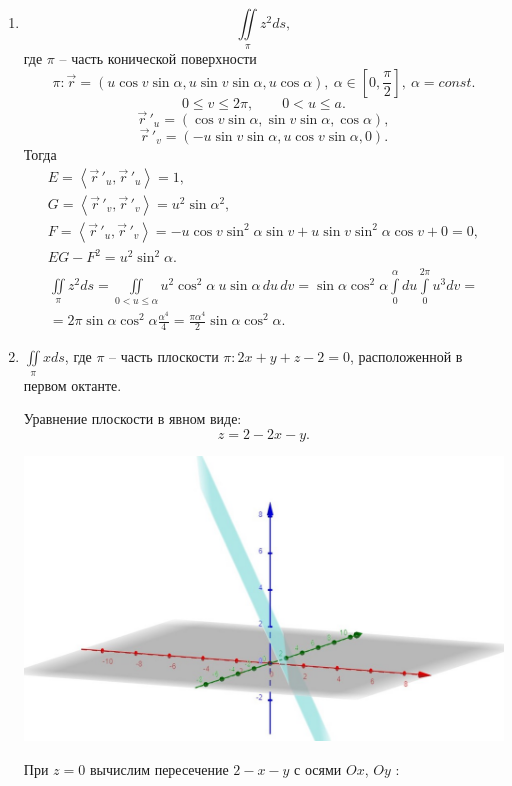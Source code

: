 \documentclass[../../main.tex]{subfiles}
\begin{document}
	\begin{exmps}
	
	\,
	
	\begin{enumerate}
	\item
	\[ \iint \limits_\pi z^2 ds,\] где $\pi$ \--- часть конической 
	поверхности
	\[\pi: \vec{r} = (u\cos v\sin \alpha, u\sin v\sin\alpha, 
	u\cos\alpha) , \ 
	  \alpha\in \left[0, \frac{\pi}{2}\right], \ \alpha = const.\] 
	\[0 \leq v \leq 2\pi, \qquad 0 < u \leq a. \]
	\[\vec r\,'_u = (\cos v \sin \alpha, \sin v \sin \alpha, \cos \alpha), \]
	\[\vec r\,'_v = (-u \sin v \sin \alpha, u \cos v \sin \alpha, 0).  \]
	Тогда
	\begin{gather*}
	E = \left<\vec r\,'_u, \vec r\,'_u\right>= 1, \\ G = \left<\vec r\,'_v, \vec 
	r\,'_v\right> = u^2 \sin \alpha^2, \\
	F = \left<\vec r\,'_u, \vec r\,'_v\right> = -u \cos v \sin^2 \alpha \sin 
	v +
	 u \sin v \sin ^2 \alpha \cos v+0 =0, \\
	EG - F^2 = u^2 \sin^2 \alpha.
	\end{gather*}
	\begin{gather*}
	\iint \limits_\pi z^2 ds = \iint\limits_{0<u \leq \alpha} u^2 \cos^2 \alpha
	 \ u \sin \alpha \,du\, dv = \sin \alpha \cos ^2 \alpha \int \limits_0^\alpha 
	 du
	  \int \limits_0 ^{2\pi} u^3 dv = \\ = 2 \pi \sin \alpha \cos ^2 \alpha 
	  \frac{\alpha^4}{4} =
	   \frac{\pi \alpha^4}{2} \sin \alpha \cos^2 \alpha.
	\end{gather*}
	\item 
	$\displaystyle\iint \limits_\pi x ds$, где $\pi$ \--- часть плоскости
	$\pi : 2x+y+z-2=0$, расположенной в первом октанте.
	
	Уравнение плоскости в явном виде:
	\[z = 2 -2x -y.\]
	\begin{center}
	 \includegraphics[scale = 0.2]{lec23-2.jpg}
	\end{center}	
	При $z = 0$ вычислим пересечение $2 -x-y$ с осями $Ox$, $Oy$ :
	

\end{enumerate}
\end{exmps}
\end{document}
